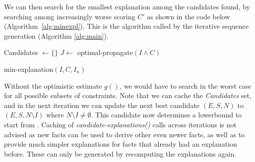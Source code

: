 We can then search for the smallest explanation among the candidates found, by searching among increasingly worse scoring $C'$ as shown in the code below (Algorithm~\ref{alg:minexpl}). This is the algorithm called by the iterative sequence generation (Algorithm \ref{alg:main}).

\begin{algorithm}


  Candidates $\gets \{\}$\;
  $J \gets$ optimal-propagate$(I \wedge C)$\;
\caption{min-explanation$(I,C,I_n)$}
\label{alg:minexpl}
\end{algorithm}

Without the optimistic estimate $g()$, we would have to search in the worst case for all possible subsets of constraints. Note that we can cache the \textit{Candidates} set, and in the next iteration we can update the next best candidate $(E, S, N)$ to $(E, S, N \setminus I)$ where $N \setminus I \neq \emptyset$. This candidate now determines a lowerbound to start from .
Caching of \textit{candidate-explanations()} calls across iterations is not advised as new facts can be used to derive other even newer facts, as well as to provide much simpler explanations for facts that already had an explanation before. These can only be generated by recomputing the explanations again. %

